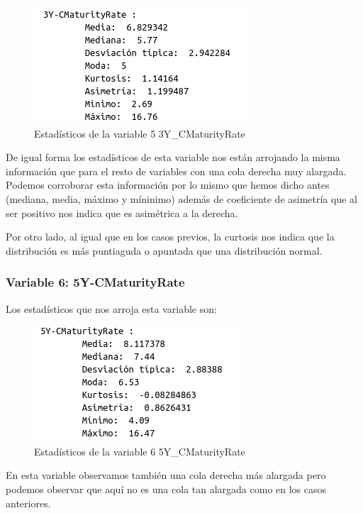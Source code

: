 \documentclass[12pt,a4paper]{article}
\begin{document}
\begin{figure}[H]
	\centering
	\includegraphics[scale=0.7]{./Imagenes/EDA/Regresion/estadisticos_3Y_CMaturityRate.png}
	\caption{Estadísticos de la variable 5 3Y\_CMaturityRate}
\end{figure}

De igual forma los estadísticos de esta variable nos están arrojando la misma información que para el resto de variables con una cola derecha muy alargada. Podemos corroborar esta información por lo mismo que hemos dicho antes (mediana, media, máximo y míninimo) además de coeficiente de asimetría que al ser positivo nos indica que es asimétrica a la derecha.

Por otro lado, al igual que en los casos previos, la curtosis nos indica que la distribución es más puntiaguda o apuntada que una distribución normal.

\subsubsection*{Variable 6: 5Y-CMaturityRate}

Los estadísticos que nos arroja esta variable son:

\begin{figure}[H]
	\centering
	\includegraphics[scale=0.7]{./Imagenes/EDA/Regresion/estadisticos_5Y_CMaturityRate.png}
	\caption{Estadísticos de la variable 6 5Y\_CMaturityRate}
\end{figure}

En esta variable observamos también una cola derecha más alargada pero podemos observar que aquí no es una cola tan alargada como en los casos anteriores. 
\end{document}
